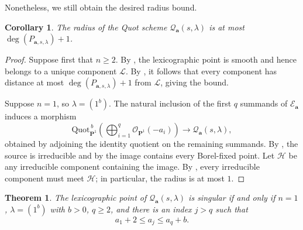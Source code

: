 \documentclass[leqno,11pt,a4paper]{amsart}
\newtheorem{thm}{Theorem}[section]
\newtheorem{cor}[cor]{Corollary}
\theoremstyle{definition}
\numberwithin{equation}{section}
\newcommand{\bfa}{\mathbf{a}}
\newcommand{\Quot}{\mathrm{Quot}}
\newcommand{\PP}{\mathbf{P}}
\newcommand{\EE}{\mathscr{E}}
\newcommand{\OO}{\mathscr{O}}
\newcommand{\HH}{\mathcal{H}}
\newcommand{\LL}{\mathcal{L}}
\newcommand{\QQ}{\mathcal{Q}}
\begin{document}
Nonetheless, we still obtain the desired radius bound.


\begin{cor} \label{radius_bound} The radius of the Quot scheme $\QQ_{\bfa}(s,\lambda)$ is at most $\deg(P_{\bfa,s,\lambda}) +1$. 
\end{cor}
\begin{proof}
Suppose first that $n\geq2$. By , the lexicographic point is smooth and hence belongs
to a unique component $\LL$. By , it follows that every component has distance at most $\deg(P_{\bfa,s,\lambda})+1$ from $\LL$, giving the bound.

Suppose $n=1$, so $\lambda=(1^b)$.
The natural inclusion of the first $q$ summands of $\EE_{\bfa}$ induces a morphism
$$
\Quot_{\PP^1}^{\,b} \left(\bigoplus_{i=1}^q\OO_{\PP^1}(-a_i)\right) \longrightarrow \QQ_{\bfa}(s,\lambda),
$$
obtained by adjoining the identity quotient on the remaining summands. 
By \cite[Corollary 4.7]{BFP20}, the source is irreducible and by  the image contains every Borel-fixed point. 
Let $\HH$ be any irreducible component containing the image. 
By , every irreducible component must meet $\HH$; in particular, the radius is at most $1$.
\end{proof}


\begin{thm}\label{lex_smooth_all}
The lexicographic point of $\QQ_{\bfa}(s,\lambda)$ is singular
if and only if $n=1$, $\lambda=(1^b)$ with $b>0$, $q\geq2$,
and there is an index $j>q$ such that
$$
a_1+2\leq a_j\leq a_q+b.
$$
\end{thm}
\end{document}

